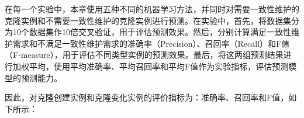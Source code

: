 在每一个实验中，本章使用五种不同的机器学习方法，并同时对需要一致性维护的克隆实例和不需要一致性维护的克隆实例进行预测。在实验中，首先，将数据集分为10个数据集作10倍交叉验证，用于评估预测效果。然后，分别计算满足一致性维护需求和不满足一致性维护需求的准确率（Precision）、召回率（Recall）和F值（F-measure），用于评估不同类型实例的预测效果。最后，将这两组预测结果进行加权平均，使用平均准确率、平均召回率和平均F值作为实验指标，评估预测模型的预测能力。

因此，对克隆创建实例和克隆变化实例的评价指标为：准确率、召回率和F值，如下所示：

